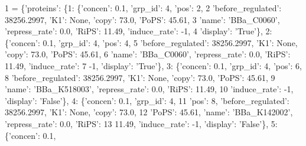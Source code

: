 \begin{DoxyCode}
1 = \{\textcolor{stringliteral}{'proteins'}: \{1: \{\textcolor{stringliteral}{'concen'}: 0.1, \textcolor{stringliteral}{'grp\_id'}: 4, \textcolor{stringliteral}{'pos'}: 2,
2     \textcolor{stringliteral}{'before\_regulated'}: 38256.2997, \textcolor{stringliteral}{'K1'}: \textcolor{keywordtype}{None}, \textcolor{stringliteral}{'copy'}: 73.0, \textcolor{stringliteral}{'PoPS'}: 45.61,
3     \textcolor{stringliteral}{'name'}: \textcolor{stringliteral}{'BBa\_C0060'}, \textcolor{stringliteral}{'repress\_rate'}: 0.0, \textcolor{stringliteral}{'RiPS'}: 11.49, \textcolor{stringliteral}{'induce\_rate'}: -1,
4     \textcolor{stringliteral}{'display'}: \textcolor{stringliteral}{'True'}\}, 2: \{\textcolor{stringliteral}{'concen'}: 0.1, \textcolor{stringliteral}{'grp\_id'}: 4, \textcolor{stringliteral}{'pos'}: 4,
5       \textcolor{stringliteral}{'before\_regulated'}: 38256.2997, \textcolor{stringliteral}{'K1'}: \textcolor{keywordtype}{None}, \textcolor{stringliteral}{'copy'}: 73.0, \textcolor{stringliteral}{'PoPS'}: 45.61,
6       \textcolor{stringliteral}{'name'}: \textcolor{stringliteral}{'BBa\_C0060'}, \textcolor{stringliteral}{'repress\_rate'}: 0.0, \textcolor{stringliteral}{'RiPS'}: 11.49, \textcolor{stringliteral}{'induce\_rate'}:
7       -1, \textcolor{stringliteral}{'display'}: \textcolor{stringliteral}{'True'}\}, 3: \{\textcolor{stringliteral}{'concen'}: 0.1, \textcolor{stringliteral}{'grp\_id'}: 4, \textcolor{stringliteral}{'pos'}: 6,
8         \textcolor{stringliteral}{'before\_regulated'}: 38256.2997, \textcolor{stringliteral}{'K1'}: \textcolor{keywordtype}{None}, \textcolor{stringliteral}{'copy'}: 73.0, \textcolor{stringliteral}{'PoPS'}: 45.61,
9         \textcolor{stringliteral}{'name'}: \textcolor{stringliteral}{'BBa\_K518003'}, \textcolor{stringliteral}{'repress\_rate'}: 0.0, \textcolor{stringliteral}{'RiPS'}: 11.49,
10         \textcolor{stringliteral}{'induce\_rate'}: -1, \textcolor{stringliteral}{'display'}: \textcolor{stringliteral}{'False'}\}, 4: \{\textcolor{stringliteral}{'concen'}: 0.1, \textcolor{stringliteral}{'grp\_id'}: 4,
11           \textcolor{stringliteral}{'pos'}: 8, \textcolor{stringliteral}{'before\_regulated'}: 38256.2997, \textcolor{stringliteral}{'K1'}: \textcolor{keywordtype}{None}, \textcolor{stringliteral}{'copy'}: 73.0,
12           \textcolor{stringliteral}{'PoPS'}: 45.61, \textcolor{stringliteral}{'name'}: \textcolor{stringliteral}{'BBa\_K142002'}, \textcolor{stringliteral}{'repress\_rate'}: 0.0, \textcolor{stringliteral}{'RiPS'}:
13           11.49, \textcolor{stringliteral}{'induce\_rate'}: -1, \textcolor{stringliteral}{'display'}: \textcolor{stringliteral}{'False'}\}, 5: \{\textcolor{stringliteral}{'concen'}: 0.1,

\end{DoxyCode}
